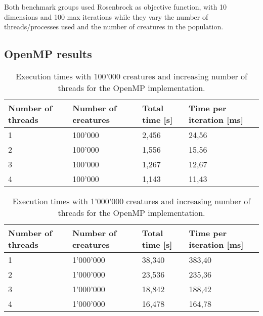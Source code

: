 \documentclass[12pt,a4paper,oneside]{article}
\begin{document}
	Both benchmark groups used Rosenbrock as objective function, with 10 dimensions and 100 max iterations while they vary the number of threads/processes used and the number of creatures in the population.

	\subsection{OpenMP results}
	\begin{table}[!ht]
		\begin{tabular}{|l|l|l|l|}
		\hline
		Number of threads & Number of creatures & Total time {[}s{]} & Time per iteration {[}ms{]} \\ \hline
		1                 & 100'000             & 2,456              & 24,56                       \\ \hline
		2                 & 100'000             & 1,556              & 15,56                       \\ \hline
		3                 & 100'000             & 1,267              & 12,67                       \\ \hline
		4                 & 100'000             & 1,143              & 11,43                       \\ \hline
		\end{tabular}
		\caption{Execution times with 100'000 creatures and increasing number of threads for the OpenMP implementation.}
	\end{table}

	\begin{table}[!ht]
		\begin{tabular}{|l|l|l|l|}
		\hline
		Number of threads & Number of creatures & Total time {[}s{]} & Time per iteration {[}ms{]} \\ \hline
		1                 & 1'000'000           & 38,340             & 383,40                      \\ \hline
		2                 & 1'000'000           & 23,536             & 235,36                      \\ \hline
		3                 & 1'000'000           & 18,842             & 188,42                      \\ \hline
		4                 & 1'000'000           & 16,478             & 164,78                      \\ \hline
		\end{tabular}
		\caption{Execution times with 1'000'000 creatures and increasing number of threads for the OpenMP implementation.}
	\end{table}
\end{document}
